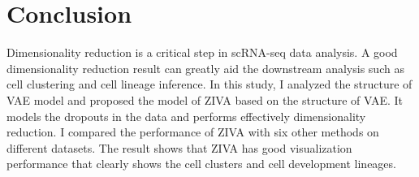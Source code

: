 \section{Conclusion}
Dimensionality reduction is a critical step in scRNA-seq data analysis. A good dimensionality reduction result can greatly aid the downstream analysis such as cell clustering and cell lineage inference.
In this study, I analyzed the structure of VAE model and proposed the model of ZIVA based on the structure of VAE. It models the dropouts in the data and performs effectively dimensionality reduction. I compared the performance of ZIVA with six other methods on different datasets. The result shows that ZIVA has good visualization performance that clearly shows the cell clusters and cell development lineages.

